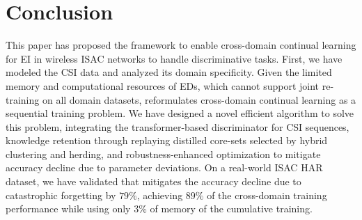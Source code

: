 \section{Conclusion}
\label{sec_conclu}

This paper has proposed the \name framework to enable cross-domain continual learning for EI in wireless ISAC networks to handle discriminative tasks.
First, we have modeled the CSI data and analyzed its domain specificity.
Given the limited memory and computational resources of EDs, which cannot support joint re-training on all domain datasets, \name reformulates cross-domain continual learning as a sequential training problem.
We have designed a novel efficient algorithm to solve this problem, integrating the transformer-based discriminator for CSI sequences, knowledge retention through replaying distilled core-sets selected by hybrid clustering and herding, and robustness-enhanced optimization to mitigate accuracy decline due to parameter deviations.
On a real-world ISAC HAR dataset, we have validated that \name mitigates the accuracy decline due to catastrophic forgetting by $79\%$, achieving $89\%$ of the cross-domain training performance while using only $3\%$ of memory of the cumulative training.